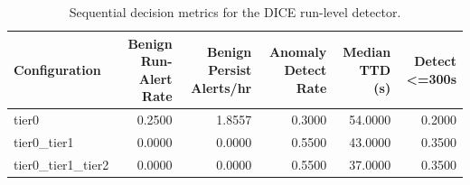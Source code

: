 \begin{table}[t]
\centering
\caption{Sequential decision metrics for the DICE run-level detector.}
\label{tab:dice_sequential_metrics}
\footnotesize
\begin{tabular}{lrrrrr}
\toprule
Configuration & Benign Run-Alert Rate & Benign Persist Alerts/hr & Anomaly Detect Rate & Median TTD (s) & Detect <=300s \\
\midrule
tier0 & 0.2500 & 1.8557 & 0.3000 & 54.0000 & 0.2000 \\
tier0_tier1 & 0.0000 & 0.0000 & 0.5500 & 43.0000 & 0.3500 \\
tier0_tier1_tier2 & 0.0000 & 0.0000 & 0.5500 & 37.0000 & 0.3500 \\
\bottomrule
\end{tabular}

\end{table}
